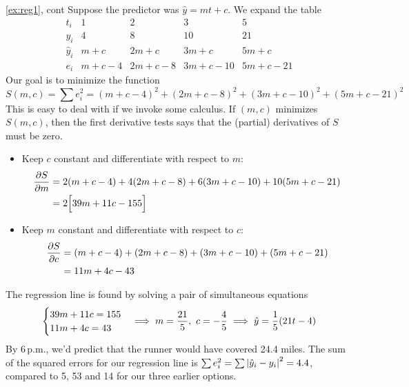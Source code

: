 \begin{example*}{\ref{ex:reg1}, cont}{}
	Suppose the predictor was $\hat y=mt+c$. We expand the table
	\[
		\begin{array}{c|ccccc}
			t_i&1&2&3&5\\\hline
			y_i&4&8&10&21\\\hline
		\hat y_i&m+c&2m+c&3m+c&5m+c\\\hline
		e_i&m+c-4&2m+c-8&3m+c-10&5m+c-21
		\end{array}
	\]
	Our goal is to minimize the function
	\[
		S(m,c) =\sum e_i^2= (m+c-4)^2 +(2m+c-8)^2 +(3m+c-10)^2 +(5m+c-21)^2
	\]
	This is easy to deal with if we invoke some calculus. If $(m,c)$ minimizes $S(m,c)$, then the first derivative tests says that the (partial) derivatives of $S$ must be zero.%
	\begin{itemize}\itemsep0pt
	  \item Keep $c$ constant and differentiate with respect to $m$:
	  \begin{align*}
			\partials[S]{m} &=2(m+c-4) +4(2m+c-8) +6(3m+c-10) +10(5m+c-21)\\
			&=2\Bigl[39m+11c-155\Bigr]
		\end{align*}
		\item Keep $m$ constant and differentiate with respect to $c$:
	  \begin{align*}
			\partials[S]{c} &=(m+c-4) +(2m+c-8) +(3m+c-10) +(5m+c-21)\\
			&=11m+4c-43
		\end{align*}
	\end{itemize}
	The regression line is found by solving a pair of simultaneous equations
	\[
		\begin{cases}
			39m+11c=155\\
			11m+4c=43
		\end{cases}
		\negthickspace\implies 
	m=\frac{21}{5},\ c=-\frac{4}{5} \implies \hat y=\frac 1{5}(21t-4)
	\]
	By 6\,p.m., we'd predict that the runner would have covered 24.4 miles. The sum of the squared errors for our regression line is $\sum e_i^2=\sum\nm{\hat y_i-y_i}^2=4.4$, compared to 5, 53 and 14 for our three earlier options.
\end{example*}


